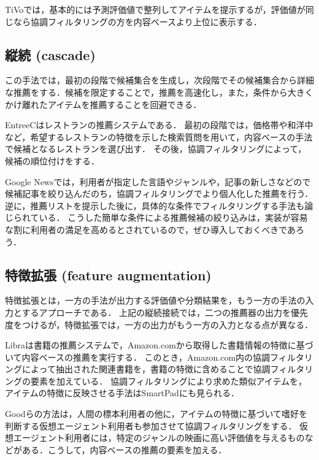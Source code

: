 TiVo\cite{kdd:04:11}では，基本的には予測評価値で整列してアイテムを提示するが，評価値が同じなら協調フィルタリングの方を内容ベースより上位に表示する．

\subsection{縦続 (cascade)}

この手法では，最初の段階で候補集合を生成し，次段階でその候補集合から詳細な推薦をする．候補を限定することで，推薦を高速化し，また，条件から大きくかけ離れたアイテムを推薦することを回避できる．

EntreeC\cite{ej:048}はレストランの推薦システムである．
最初の段階では，価格帯や和洋中など，希望するレストランの特徴を示した検索質問を用いて，内容ベースの手法で候補となるレストランを選び出す．
その後，協調フィルタリングによって，候補の順位付けをする．

Google News\cite{www:07:01}では，利用者が指定した言語やジャンルや，記事の新しさなどので候補記事を絞り込んだのち，協調フィルタリングでより個人化した推薦を行う．
逆に，推薦リストを提示した後に，具体的な条件でフィルタリングする手法\cite{sigir:01:01}も論じられている．
こうした簡単な条件による推薦候補の絞り込みは，実装が容易な割に利用者の満足を高めるとされているので\cite{sigir:01:01}，ぜひ導入しておくべきであろう．

\subsection{特徴拡張 (feature augmentation)}

特徴拡張とは，一方の手法が出力する評価値や分類結果を，もう一方の手法の入力とするアプローチである．
上記の縦続接続では，二つの推薦器の出力を優先度をつけるが，特徴拡張では，一方の出力がもう一方の入力となる点が異なる．

Libra\cite{sigir:99:01}は書籍の推薦システムで，Amazon.comから取得した書籍情報の特徴に基づいて内容ベースの推薦を実行する．
このとき，Amazon.com内の協調フィルタリングによって抽出された関連書籍を，書籍の特徴に含めることで協調フィルタリングの要素を加えている．
協調フィルタリングにより求めた類似アイテムを，アイテムの特徴に反映させる手法はSmartPad\cite{dmkd:01:02}にも見られる．

Goodらの方法\cite{aaai:99:01}は，人間の標本利用者の他に，アイテムの特徴に基づいて嗜好を判断する仮想エージェント利用者も参加させて協調フィルタリングをする．
仮想エージェント利用者には，特定のジャンルの映画に高い評価値を与えるものなどがある．こうして，内容ベースの推薦の要素を加える．

